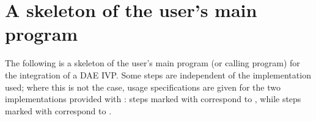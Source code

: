\section{A skeleton of the user's main program}\label{ss:skeleton_sim}

The following is a skeleton of the user's main program (or calling
program) for the integration of a DAE IVP. Some steps are independent of the {\nvector}
implementation used; where this is not the case, usage specifications are given for the
two implementations provided with {\ida}: steps marked with {\p} correspond to 
{\nvecp}, while steps marked with {\s} correspond to {\nvecs}.
